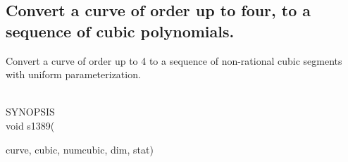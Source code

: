 \subsection{Convert a curve of order up to four, to a sequence of cubic polynomials.}
\begin{minipg1}
  Convert a curve of order up to 4 to a sequence of non-rational cubic
  segments with uniform parameterization.
\end{minipg1} \\
SYNOPSIS\\
        \>void s1389(\begin{minipg3}
                                {\fov curve}, {\fov cubic}, {\fov numcubic}, {\fov dim}, {\fov stat})
                \end{minipg3}\\[0.3ex]

